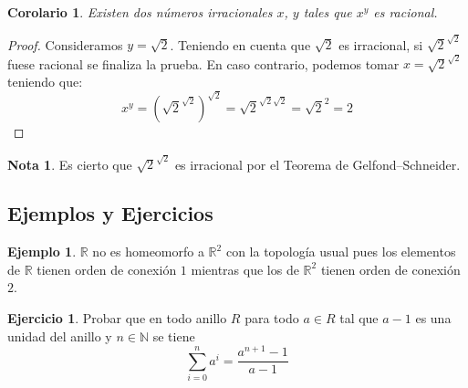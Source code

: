 \documentclass{article}
\theoremstyle{theorem-style}  %
\newtheorem{corollary}[theorem]{Corolario} %
\theoremstyle{definition}
\newtheorem*{note}{Nota} %
\theoremstyle{example-style}
\newtheorem{example}{Ejemplo}[section]
\newtheorem{exercise}{Ejercicio}[section]
\begin{document}
        \begin{corollary}
            Existen dos números irracionales $x$, $y$ tales que $x^y$ es racional.
        \end{corollary}
        \begin{proof}
            Consideramos $y = \sqrt 2$. Teniendo en cuenta que $\sqrt 2$ es irracional, si 
            ${\sqrt 2} ^ {\sqrt 2}$ fuese racional se finaliza la prueba. En caso contrario,
            podemos tomar $x = {\sqrt 2} ^ {\sqrt 2}$ teniendo que:
             $$ x ^ y = \left({\sqrt 2}^{\sqrt 2}\right) ^ {\sqrt 2} = {\sqrt 2} ^ {\sqrt 2 \sqrt 2} = {\sqrt 2} ^ 2 = 2 $$ 
        \end{proof}
        
        \begin{note}
            Es cierto que  ${\sqrt 2} ^ {\sqrt 2}$ es irracional por el Teorema de Gelfond–Schneider.
        \end{note}
    
    
    \subsection{Ejemplos y Ejercicios}
    
        \begin{example}
            $\mathbb{R}$ no es homeomorfo a $\mathbb{R}^2$ con la topología usual pues los elementos de $\mathbb{R}$ tienen orden de conexión $1$ mientras que los de $\mathbb{R}^2$ tienen orden de conexión $2$.
        \end{example}
        
        \begin{exercise}
            Probar que en todo anillo $R$ para todo $a \in R$ tal que $a-1$ es una unidad del anillo y $n \in \mathbb{N}$ se tiene
            \begin{equation}
                \sum^n_{i=0} a^i = \frac{a^{n+1}-1}{a-1}
            \end{equation}        
        \end{exercise}
    
\end{document}
